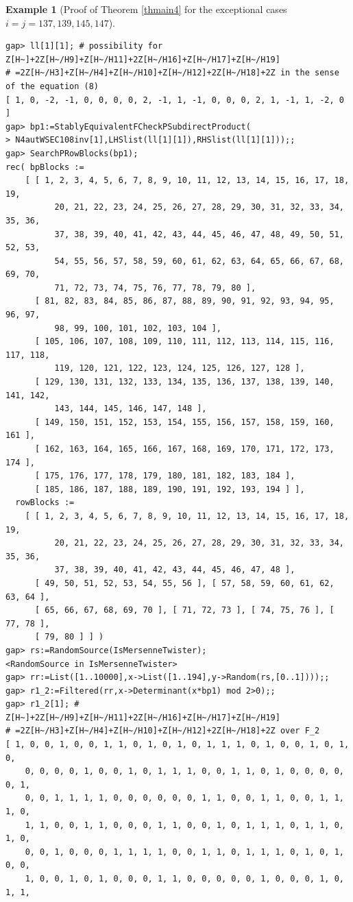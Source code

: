 \documentclass{amsart}
\theoremstyle{plain}
\theoremstyle{definition}
\newtheorem{example}[theorem]{Example}
\theoremstyle{remark}
\begin{document}
\begin{example}[Proof of {Theorem \ref{thmain4}} for the exceptional cases $i=j=137,139,145,147$]
\begin{verbatim}
gap> ll[1][1]; # possibility for Z[H~]+2Z[H~/H9]+Z[H~/H11]+2Z[H~/H16]+Z[H~/H17]+Z[H~/H19]
# =2Z[H~/H3]+Z[H~/H4]+Z[H~/H10]+Z[H~/H12]+2Z[H~/H18]+2Z in the sense of the equation (8)
[ 1, 0, -2, -1, 0, 0, 0, 0, 2, -1, 1, -1, 0, 0, 0, 2, 1, -1, 1, -2, 0 ]
gap> bp1:=StablyEquivalentFCheckPSubdirectProduct(
> N4autWSEC108inv[1],LHSlist(ll[1][1]),RHSlist(ll[1][1]));;
gap> SearchPRowBlocks(bp1);
rec( bpBlocks := 
    [ [ 1, 2, 3, 4, 5, 6, 7, 8, 9, 10, 11, 12, 13, 14, 15, 16, 17, 18, 19, 
          20, 21, 22, 23, 24, 25, 26, 27, 28, 29, 30, 31, 32, 33, 34, 35, 36, 
          37, 38, 39, 40, 41, 42, 43, 44, 45, 46, 47, 48, 49, 50, 51, 52, 53, 
          54, 55, 56, 57, 58, 59, 60, 61, 62, 63, 64, 65, 66, 67, 68, 69, 70, 
          71, 72, 73, 74, 75, 76, 77, 78, 79, 80 ], 
      [ 81, 82, 83, 84, 85, 86, 87, 88, 89, 90, 91, 92, 93, 94, 95, 96, 97, 
          98, 99, 100, 101, 102, 103, 104 ], 
      [ 105, 106, 107, 108, 109, 110, 111, 112, 113, 114, 115, 116, 117, 118, 
          119, 120, 121, 122, 123, 124, 125, 126, 127, 128 ], 
      [ 129, 130, 131, 132, 133, 134, 135, 136, 137, 138, 139, 140, 141, 142, 
          143, 144, 145, 146, 147, 148 ], 
      [ 149, 150, 151, 152, 153, 154, 155, 156, 157, 158, 159, 160, 161 ], 
      [ 162, 163, 164, 165, 166, 167, 168, 169, 170, 171, 172, 173, 174 ], 
      [ 175, 176, 177, 178, 179, 180, 181, 182, 183, 184 ], 
      [ 185, 186, 187, 188, 189, 190, 191, 192, 193, 194 ] ], 
  rowBlocks := 
    [ [ 1, 2, 3, 4, 5, 6, 7, 8, 9, 10, 11, 12, 13, 14, 15, 16, 17, 18, 19, 
          20, 21, 22, 23, 24, 25, 26, 27, 28, 29, 30, 31, 32, 33, 34, 35, 36, 
          37, 38, 39, 40, 41, 42, 43, 44, 45, 46, 47, 48 ], 
      [ 49, 50, 51, 52, 53, 54, 55, 56 ], [ 57, 58, 59, 60, 61, 62, 63, 64 ], 
      [ 65, 66, 67, 68, 69, 70 ], [ 71, 72, 73 ], [ 74, 75, 76 ], [ 77, 78 ], 
      [ 79, 80 ] ] )
gap> rs:=RandomSource(IsMersenneTwister);
<RandomSource in IsMersenneTwister>
gap> rr:=List([1..10000],x->List([1..194],y->Random(rs,[0..1])));;
gap> r1_2:=Filtered(rr,x->Determinant(x*bp1) mod 2>0);;
gap> r1_2[1]; # Z[H~]+2Z[H~/H9]+Z[H~/H11]+2Z[H~/H16]+Z[H~/H17]+Z[H~/H19]
# =2Z[H~/H3]+Z[H~/H4]+Z[H~/H10]+Z[H~/H12]+2Z[H~/H18]+2Z over F_2
[ 1, 0, 0, 1, 0, 0, 1, 1, 0, 1, 0, 1, 0, 1, 1, 1, 0, 1, 0, 0, 1, 0, 1, 0, 
    0, 0, 0, 0, 1, 0, 0, 1, 0, 1, 1, 1, 0, 0, 1, 1, 0, 1, 0, 0, 0, 0, 0, 1, 
    0, 0, 1, 1, 1, 1, 0, 0, 0, 0, 0, 0, 1, 1, 0, 0, 1, 1, 0, 0, 1, 1, 1, 0, 
    1, 1, 0, 0, 1, 1, 0, 0, 0, 1, 1, 0, 0, 1, 0, 1, 1, 1, 0, 1, 1, 0, 1, 0, 
    0, 0, 1, 0, 0, 0, 1, 1, 1, 1, 0, 0, 1, 1, 0, 1, 1, 1, 0, 1, 0, 1, 0, 0, 
    1, 0, 0, 1, 0, 1, 0, 0, 0, 1, 1, 0, 0, 0, 0, 0, 1, 0, 0, 0, 1, 0, 1, 1, 

\end{verbatim}
\end{example}
\end{document}
